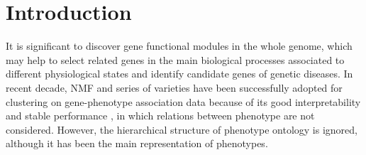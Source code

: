 \documentclass{bmcart}
\begin{document}
\begin{frontmatter}
\begin{abstractbox}

\begin{keyword}
\end{keyword}


\end{abstractbox}
%

\end{frontmatter}



\section*{Introduction}
It is significant to discover gene functional modules in the whole genome, which may help to select related genes in the main biological processes associated to different physiological states and identify candidate genes of genetic diseases. In recent decade, NMF and series of varieties have been successfully adopted for clustering on gene-phenotype association data because of its good interpretability and stable performance \cite{document_cluster_NMF,cluster_bwk}, in which relations between phenotype are not considered. However, the hierarchical structure of phenotype ontology is ignored, although it has been the main representation of phenotypes.
\end{document}
